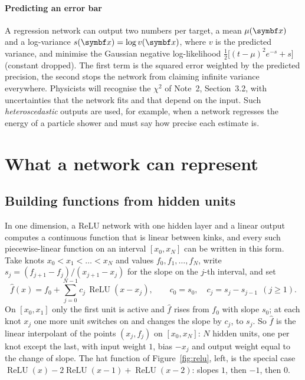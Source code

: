 \documentclass[11pt]{article}
\newcommand{\relu}{\operatorname{ReLU}}
\begin{document}
\paragraph{Predicting an error bar} A regression network can output two numbers per target, a mean $\mu(\x)$ and a
log-variance $s(\x) = \log v(\x)$, where $v$ is the predicted variance, and minimise the Gaussian negative log-likelihood
$\frac12\big[(t - \mu)^2e^{-s} + s\big]$ (constant dropped). The first term is the squared error weighted by the
predicted precision, the second stops the network from claiming infinite variance everywhere. Physicists will recognise
the $\chi^2$ of Note~2, Section~3.2, with uncertainties that the network fits and that depend on the input. Such \emph{heteroscedastic} outputs are used, for example, when a
network regresses the energy of a particle shower and must say how precise each estimate is.

\section{What a network can represent}\label{sec:expressive}

\subsection{Building functions from hidden units}\label{sec:building}

In one dimension, a ReLU network with one hidden layer and a linear output computes a continuous function that is
linear between kinks, and every such piecewise-linear function on an interval $[x_0, x_N]$ can be written in this form. Take knots $x_0 < x_1 < \dots < x_N$ and values $f_0,
f_1, \dots, f_N$, write $s_j = (f_{j+1} - f_j)/(x_{j+1} - x_j)$ for the slope on the $j$-th interval, and set
\begin{equation}\label{eq:interp}
  \hat f(x) = f_0 + \sum_{j=0}^{N-1} c_j\,\relu(x - x_j), \qquad c_0 = s_0, \quad c_j = s_j - s_{j-1}\ \ (j \ge 1) .
\end{equation}
On $[x_0, x_1]$ only the first unit is active and $\hat f$ rises from $f_0$ with slope $s_0$; at each knot $x_j$ one more
unit switches on and changes the slope by $c_j$, to $s_j$. So $\hat f$ is the linear interpolant of the points
$(x_j, f_j)$ on $[x_0, x_N]$: $N$ hidden units, one per knot except the last, with input weight $1$, bias $-x_j$ and output weight
equal to the change of slope. The hat function of Figure~\ref{fig:relu}, left, is the special case $\relu(x) -
2\relu(x - 1) + \relu(x - 2)$: slopes $1$, then $-1$, then $0$.
\end{document}
